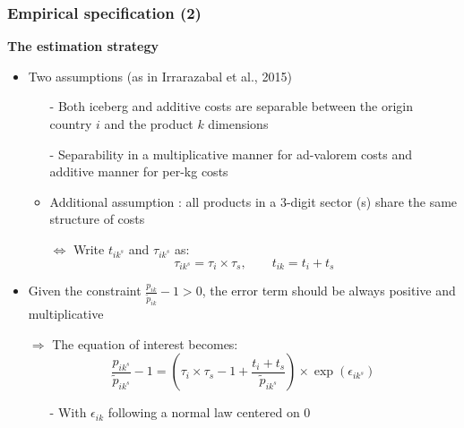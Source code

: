 \documentclass[10 pt,Helvetica, french]{beamer}
\begin{document}
\begin{frame}
\frametitle{Empirical specification (2)}
\textbf{The estimation strategy}
\begin{itemize}
\item Two assumptions (as in Irrarazabal et al., 2015) \vspace{0.1cm}
\begin{itemize}
\item[-] Both iceberg and additive costs are separable between the origin country $i$ and the product $k$ dimensions \vspace{0.1cm}
\item[-] Separability in a multiplicative manner for ad-valorem costs and additive manner for per-kg costs \vspace{0.1cm}
\item Additional assumption : all products in a 3-digit sector (s) share the same structure of costs \vspace{0.1cm}
\item[$\Leftrightarrow$] Write $t_{ik^s}$ and $\tau_{ik^s}$ as:
\begin{equation}
 \tau_{ik^s} = \tau_{i} \times \tau_{s}, \qquad t_{ik} = t_{i} + t_{s} \label{eq:specifTC}
 \end{equation}
\end{itemize}
\item Given the constraint $\frac{p_{ik}}{\widetilde{p}_{ik}} -1>0$, the error term should be always positive and multiplicative \vspace{0.1cm}
\item[$\Rightarrow$] The equation of interest becomes:
\footnotesize
$$\frac{p_{ik^s}}{\widetilde{p}_{ik^s}}-1 =\left(\tau_{i} \times \tau_{s} -1+\frac{t_{i} + t_{s}}{\widetilde{p}_{ik^s}} \right)\times \exp(\epsilon_{ik^s})$$
\normalsize
\begin{itemize}
\item[-] With $\epsilon_{ik}$ following a normal law centered on 0
\end{itemize}

\end{itemize}
\end{frame}
\end{document}
